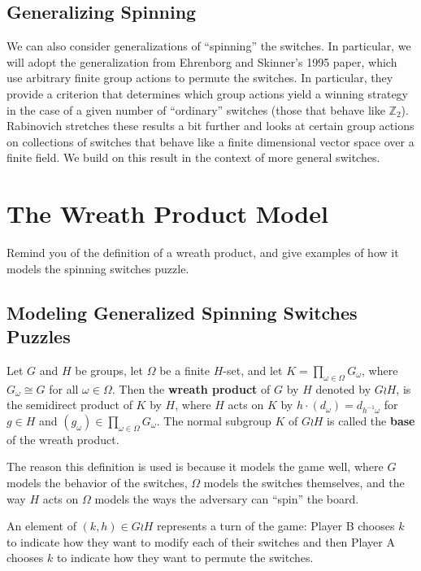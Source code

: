 \subsection{Generalizing Spinning}
We can also consider generalizations of ``spinning'' the switches.
In particular, we will adopt the generalization from
Ehrenborg and Skinner's \cite{Ehrenborg1995} 1995 paper, which use
arbitrary finite group actions to permute the switches.
In particular, they provide a criterion that determines which group actions
yield a winning strategy in the case of a given number of ``ordinary'' switches
(those that behave like $\mathbb Z_2$).
Rabinovich \cite{Rabinovich2022} stretches these results a bit further and
looks at certain group actions on collections of switches that behave like
a finite dimensional vector space over a finite field. We build on this result
in the context of more general switches.

\section{The Wreath Product Model}
\label{sec:WreathModel}
Remind you of the definition of a wreath product, and give examples of how it
models the spinning switches puzzle.
\subsection{Modeling Generalized Spinning Switches Puzzles}
\begin{definition}
  Let $G$ and $H$ be groups,
  let $\Omega$ be a finite $H$-set, and
  let $K = \prod_{\omega \in \Omega} G_\omega$, where $G_\omega \cong G$
  for all $\omega \in \Omega$.
  Then the \textbf{wreath product} of $G$ by $H$ denoted by $G \wr H$,
  is the semidirect product of $K$ by $H$,
  where $H$ acts on $K$ by $h \cdot (d_\omega) = d_{h^{-1}\omega}$ for $g \in H$ and
  $(g_\omega) \in \prod_{\omega \in \Omega} G_\omega$.
  The normal subgroup $K$ of $G \wr H$ is called
  the \textbf{base} of the wreath product.
\end{definition}

The reason this definition is used is because it models the game well, where
$G$ models the behavior of the switches, $\Omega$ models the switches themselves,
and the way $H$ acts on $\Omega$ models the ways the adversary can ``spin'' the
board.

An element of $(k, h) \in G \wr H$ represents a turn of the game:
Player B chooses $k$ to indicate how they want to modify each of their switches
and then Player A chooses $k$ to indicate how they want to permute the switches.

